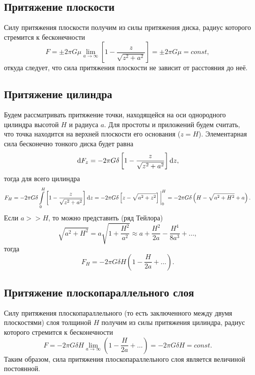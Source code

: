 \documentclass[11pt, a4paper]{article}
\theoremstyle{plain}
\theoremstyle{definition}
\theoremstyle{remark}
\begin{document}
\subsection{Притяжение плоскости}
Силу притяжения плоскости получим из силы притяжения диска, радиус которого стремится к
бесконечности
\begin{equation*}
    F = \pm2\pi G\mu\lim\limits_{a\to\infty} \left[ 1 - \dfrac{z}{\sqrt{z^2 + a^2}}\right] =
    \pm2\pi G\mu = const,
\end{equation*}
откуда следует, что сила притяжения плоскости не зависит от расстояния до неё.

\subsection{Притяжение цилиндра}
Будем рассматривать притяжение точки, находящейся на оси однородного цилиндра высотой $H$ и радиуса $a$. Для
простоты и приложений будем считать, что точка находится на верхней плоскости его основания ($z = H$).
Элементарная сила бесконечно тонкого диска будет равна
\begin{equation*}
    \dif F_z = -2\pi G\delta\left[ 1 - \dfrac{z}{\sqrt{z^2 + a^2}}\right] \dif z,
\end{equation*}
тогда для всего цилиндра
\begin{equation*}
    F_H = -2\pi G\delta\int\limits_{0}^{H}\left[ 1 - \dfrac{z}{\sqrt{z^2 + a^2}}\right] \dif z =
    -2\pi G\delta \left[ z - \sqrt{a^2 + z^2} \right] \bigg|_0^{H} =
    -2\pi G\delta\left( H - \sqrt{a^2 + H^2} + a \right).
\end{equation*}
Если $a >> H$, то можно представить (ряд Тейлора)
\begin{equation*}
    \sqrt{a^2 + H^2} = a\sqrt{1 + \dfrac{H^2}{a^2}} \approx
    a+\dfrac{H^2}{2a}-\dfrac{H^4}{8a^3}+\dots,
\end{equation*}
тогда
\begin{equation*}
    F_H = 
    -2\pi G\delta H\left( 1 - \dfrac{H}{2a} + \dots \right).
\end{equation*}

\subsection{Притяжение плоскопараллельного слоя}
Силу притяжения плоскопараллельного (то есть заключенного между двумя плоскостями) слоя толщиной $H$
получим из силы притяжения цилиндра, радиус которого стремится к бесконечности
\begin{equation*}
    F = 
    -2\pi G\delta H\lim\limits_{a\to\infty}\left( 1 - \dfrac{H}{2a} + \dots \right) = 
    -2\pi G\delta H = const.
\end{equation*}
Таким образом, сила притяжения плоскопараллельного слоя является величиной
постоянной. 
\end{document}
